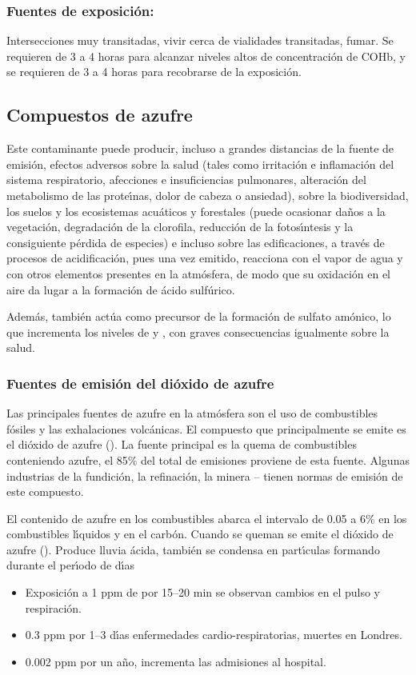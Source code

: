 \subsubsection{Fuentes de exposici\'on:}
Intersecciones muy transitadas, vivir cerca de vialidades transitadas, fumar.
Se requieren de 3 a 4 horas para alcanzar niveles altos de concentraci\'on de COHb, y
se requieren de 3 a 4 horas para recobrarse de la exposici\'on.

\subsection{Compuestos de azufre}
Este contaminante puede producir, incluso a grandes distancias de la fuente de emisión, efectos adversos sobre la salud (tales como irritación e inflamación del sistema respiratorio, afecciones e insuficiencias pulmonares, alteración del metabolismo de las prote\'{\i}nas, dolor de cabeza o ansiedad), sobre la biodiversidad, los suelos y los ecosistemas acuáticos y forestales (puede ocasionar daños a la vegetación, degradación de la clorofila, reducción de la fotos\'{\i}ntesis y la consiguiente pérdida de especies) e incluso sobre las edificaciones, a través de procesos de acidificación, pues una vez emitido, reacciona con el vapor de agua y con otros elementos presentes en la atmósfera, de modo que su oxidación en el aire da lugar a la formación de ácido sulfúrico.

Además, también actúa como precursor de la formación de sulfato amónico, lo que incrementa los niveles de  y , con graves consecuencias igualmente sobre la salud.

\subsubsection{Fuentes de emisión del dióxido de azufre} Las principales fuentes de azufre en la atmósfera son el uso de combustibles fósiles y las exhalaciones volcánicas. El compuesto que principalmente se emite es el dióxido de azufre (). La fuente   principal es la quema de combustibles conteniendo azufre, el 85\% del total de emisiones proviene de esta fuente. Algunas industrias de la fundici\'on, la refinaci\'on, la minera --  tienen normas de emisión de este compuesto.

El contenido de azufre en los combustibles abarca el intervalo de 0.05 a 6\% en los combustibles l\'{\i}quidos y en el carb\'on. Cuando se queman se emite el di\'oxido de azufre ().
Produce lluvia \'acida, tambi\'en se condensa en part\'{\i}culas formando  durante el per\'{\i}odo de d\'{\i}as
\begin{itemize}
\item Exposici\'on a 1 ppm de  por 15--20 min se observan cambios en el pulso y
respiraci\'on.
\item 0.3 ppm por 1--3 d\'{\i}as enfermedades cardio-respiratorias, muertes en Londres.
\item 0.002 ppm por un a\~no, incrementa las admisiones al hospital.
\end{itemize}

